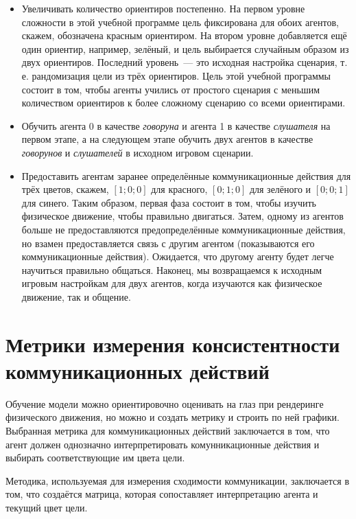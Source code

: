 \begin{itemize}
    \item Увеличивать количество ориентиров постепенно. На первом уровне сложности в этой учебной программе цель фиксирована для обоих агентов, скажем, обозначена красным ориентиром. На втором уровне добавляется ещё один ориентир, например, зелёный, и цель выбирается случайным образом из двух ориентиров. Последний уровень~--- это исходная настройка сценария, т. е. рандомизация цели из трёх ориентиров. Цель этой учебной программы состоит в том, чтобы агенты учились от простого сценария с меньшим количеством ориентиров к более сложному сценарию со всеми ориентирами.
    \item Обучить агента 0 в качестве \textit{говоруна} и агента 1 в качестве \textit{слушателя} на первом этапе, а на следующем этапе обучить двух агентов в качестве \textit{говорунов} и \textit{слушателей} в исходном игровом сценарии.
    \item Предоставить агентам заранее определённые коммуникационные действия для трёх цветов, скажем, $[1; 0; 0]$ для красного, ${[0; 1; 0]}$ для зелёного и ${[0; 0; 1]}$ для синего. Таким образом, первая фаза состоит в том, чтобы изучить физическое движение, чтобы правильно двигаться. Затем, одному из агентов больше не предоставляются предопределённые коммуникационные действия, но взамен предоставляется связь с другим агентом (показываются его коммуникационные действия). Ожидается, что другому агенту будет легче научиться правильно общаться. Наконец, мы возвращаемся к исходным игровым настройкам для двух агентов, когда изучаются как физическое движение, так и общение.
\end{itemize}


\section{Метрики измерения консистентности коммуникационных действий}

Обучение модели можно ориентировочно оценивать на глаз при рендеринге физического движения, но можно и создать метрику и строить по ней графики. Выбранная метрика для коммуникационных действий заключается в том, что агент должен однозначно интерпретировать комунникационные действия и выбирать соответствующие им цвета цели.

Методика, используемая для измерения сходимости коммуникации, заключается в том, что создаётся матрица, которая сопоставляет интерпретацию агента и текущий цвет цели.

